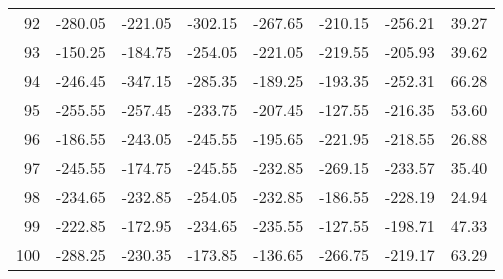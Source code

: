 \begin{longtable}{rrrrrrrr}
92 & -280.05 & -221.05 & -302.15 & -267.65 & -210.15 & -256.21 & 39.27  \\
93 & -150.25 & -184.75 & -254.05 & -221.05 & -219.55 & -205.93 & 39.62  \\
94 & -246.45 & -347.15 & -285.35 & -189.25 & -193.35 & -252.31 & 66.28  \\
95 & -255.55 & -257.45 & -233.75 & -207.45 & -127.55 & -216.35 & 53.60  \\
96 & -186.55 & -243.05 & -245.55 & -195.65 & -221.95 & -218.55 & 26.88  \\
97 & -245.55 & -174.75 & -245.55 & -232.85 & -269.15 & -233.57 & 35.40  \\
98 & -234.65 & -232.85 & -254.05 & -232.85 & -186.55 & -228.19 & 24.94  \\
99 & -222.85 & -172.95 & -234.65 & -235.55 & -127.55 & -198.71 & 47.33  \\
100 & -288.25 & -230.35 & -173.85 & -136.65 & -266.75 & -219.17 & 63.29  \\

\end{longtable}



